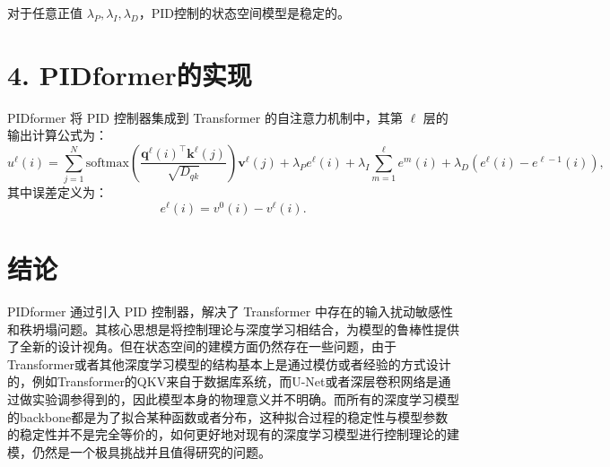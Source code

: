 \documentclass[lang=cn,a4paper,newtx]{elegantpaper}
\begin{document}
\begin{proposition}
对于任意正值 $\lambda_P, \lambda_I, \lambda_D$，PID控制的状态空间模型是稳定的。
\end{proposition}

\section*{4. PIDformer的实现}

PIDformer 将 PID 控制器集成到 Transformer 的自注意力机制中，其第 $\ell$ 层的输出计算公式为：
\[
u^\ell(i) = \sum_{j=1}^N \text{softmax}\left( \frac{\mathbf{q}^\ell(i)^\top \mathbf{k}^\ell(j)}{\sqrt{D_{qk}}} \right) \mathbf{v}^\ell(j)
+ \lambda_P e^\ell(i) + \lambda_I \sum_{m=1}^\ell e^m(i) + \lambda_D \left(e^\ell(i) - e^{\ell-1}(i)\right),
\]
其中误差定义为：
\[
e^\ell(i) = v^0(i) - v^\ell(i).
\]

\section*{结论}

PIDformer 通过引入 PID 控制器，解决了 Transformer 中存在的输入扰动敏感性和秩坍塌问题。其核心思想是将控制理论与深度学习相结合，为模型的鲁棒性提供了全新的设计视角。但在状态空间的建模方面仍然存在一些问题，由于Transformer或者其他深度学习模型的结构基本上是通过模仿或者经验的方式设计的，例如Transformer的QKV来自于数据库系统，而U-Net或者深层卷积网络是通过做实验调参得到的，因此模型本身的物理意义并不明确。而所有的深度学习模型的backbone都是为了拟合某种函数或者分布，这种拟合过程的稳定性与模型参数的稳定性并不是完全等价的，如何更好地对现有的深度学习模型进行控制理论的建模，仍然是一个极具挑战并且值得研究的问题。

\nocite{*}
\printbibliography[heading=bibintoc, title=\ebibname]

\appendix
\addappheadtotoc
\end{document}
